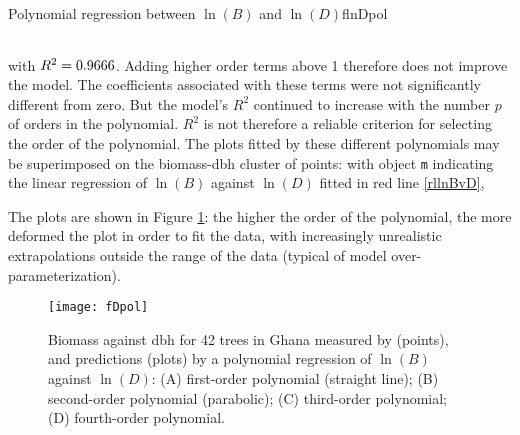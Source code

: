 \begin{filrouge}{Polynomial regression between $\ln(B)$ and $\ln(D)$}{flnDpol}
{\begin{tabular}{lrrrrl}
\end{tabular}}%
with $R^2=\mbox{0.9666}$. Adding higher order terms above 1 therefore does not improve the model. The coefficients associated with these terms were not significantly different from zero. But the model's $R^2$ continued to increase with the number $p$ of orders in the polynomial. $R^2$ is not therefore a reliable criterion for selecting the order of the polynomial. The plots fitted by these different polynomials may be superimposed on the biomass-dbh cluster of points: with object \texttt{m} indicating the linear regression of $\ln(B)$ against $\ln(D)$ fitted in red line \ref{rllnBvD},

%

The plots are shown in  Figure \ref{fDpol}: the higher the order of the polynomial, the more deformed the plot in order to fit the data, with increasingly unrealistic extrapolations outside the range of the data (typical of model over-parameterization).

\end{filrouge}

\begin{figure}[tbhp]
\texttt{[image: fDpol]}
\caption[Biomass against dbh for 42 trees in Ghana measured by \citet{henry10}, and predictions by a polynomial regression of $\ln(B)$ against $\ln(D)$: (A) first-order polynomial; (B) second-order polynomial; (C) third-order polynomial; (D) fourth-order polynomial.]{Biomass against dbh for 42 trees in Ghana measured by \citet{henry10} (points), and predictions (plots) by a polynomial regression of $\ln(B)$ against $\ln(D)$: (A) first-order polynomial (straight line); (B) second-order polynomial (parabolic); (C) third-order polynomial; (D) fourth-order polynomial.\label{fDpol}}
\end{figure}

